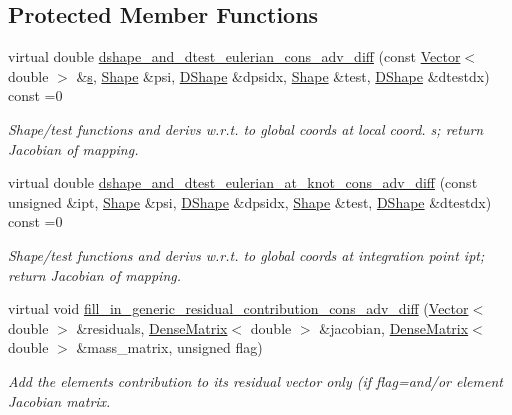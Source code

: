 \subsection*{Protected Member Functions}
\begin{DoxyCompactItemize}
\item 
virtual double \hyperlink{classoomph_1_1GeneralisedAdvectionDiffusionEquations_a7d1b7d414a32173038a7b31b65ff5e8a}{dshape\+\_\+and\+\_\+dtest\+\_\+eulerian\+\_\+cons\+\_\+adv\+\_\+diff} (const \hyperlink{classoomph_1_1Vector}{Vector}$<$ double $>$ \&\hyperlink{cfortran_8h_ab7123126e4885ef647dd9c6e3807a21c}{s}, \hyperlink{classoomph_1_1Shape}{Shape} \&psi, \hyperlink{classoomph_1_1DShape}{D\+Shape} \&dpsidx, \hyperlink{classoomph_1_1Shape}{Shape} \&test, \hyperlink{classoomph_1_1DShape}{D\+Shape} \&dtestdx) const =0
\begin{DoxyCompactList}\small\item\em Shape/test functions and derivs w.\+r.\+t. to global coords at local coord. s; return Jacobian of mapping. \end{DoxyCompactList}\item 
virtual double \hyperlink{classoomph_1_1GeneralisedAdvectionDiffusionEquations_a0e891c570cc7fa21f6b489bc5b2b77c0}{dshape\+\_\+and\+\_\+dtest\+\_\+eulerian\+\_\+at\+\_\+knot\+\_\+cons\+\_\+adv\+\_\+diff} (const unsigned \&ipt, \hyperlink{classoomph_1_1Shape}{Shape} \&psi, \hyperlink{classoomph_1_1DShape}{D\+Shape} \&dpsidx, \hyperlink{classoomph_1_1Shape}{Shape} \&test, \hyperlink{classoomph_1_1DShape}{D\+Shape} \&dtestdx) const =0
\begin{DoxyCompactList}\small\item\em Shape/test functions and derivs w.\+r.\+t. to global coords at integration point ipt; return Jacobian of mapping. \end{DoxyCompactList}\item 
virtual void \hyperlink{classoomph_1_1GeneralisedAdvectionDiffusionEquations_ae05de6e681f20f04f5ad9821f3a572c0}{fill\+\_\+in\+\_\+generic\+\_\+residual\+\_\+contribution\+\_\+cons\+\_\+adv\+\_\+diff} (\hyperlink{classoomph_1_1Vector}{Vector}$<$ double $>$ \&residuals, \hyperlink{classoomph_1_1DenseMatrix}{Dense\+Matrix}$<$ double $>$ \&jacobian, \hyperlink{classoomph_1_1DenseMatrix}{Dense\+Matrix}$<$ double $>$ \&mass\+\_\+matrix, unsigned flag)
\begin{DoxyCompactList}\small\item\em Add the element\textquotesingle{}s contribution to its residual vector only (if flag=and/or element Jacobian matrix. \end{DoxyCompactList}\end{DoxyCompactItemize}

